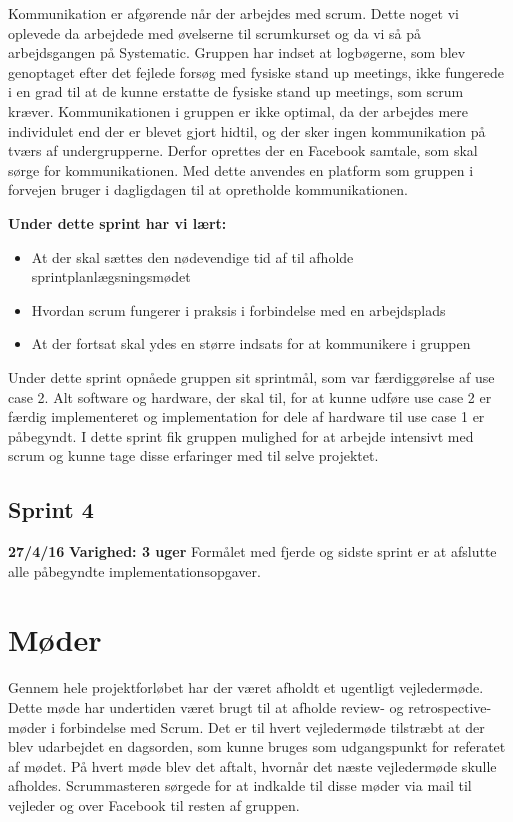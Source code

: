 	Kommunikation er afgørende når der arbejdes med scrum. Dette noget vi oplevede da arbejdede med øvelserne til scrumkurset og da vi så på arbejdsgangen på Systematic. Gruppen har indset at logbøgerne, som blev genoptaget efter det fejlede forsøg med fysiske stand up meetings, ikke fungerede i en grad til at de kunne erstatte de fysiske stand up meetings, som scrum kræver. Kommunikationen i gruppen er ikke optimal, da der arbejdes mere individulet end der er blevet gjort hidtil, og der sker ingen kommunikation på tværs af undergrupperne. Derfor oprettes der en Facebook samtale, som skal sørge for kommunikationen. Med dette anvendes en platform som gruppen i forvejen bruger i dagligdagen til at opretholde kommunikationen.  \newline 
	
	\textbf{Under dette sprint har vi lært:}
	\begin{itemize}
		\item At der skal sættes den nødevendige tid af til afholde sprintplanlægsningsmødet
		\item Hvordan scrum fungerer i praksis i forbindelse med en arbejdsplads
		\item At der fortsat skal ydes en større indsats for at kommunikere i gruppen
	\end{itemize}
	
	Under dette sprint opnåede gruppen sit sprintmål, som var færdiggørelse af use case 2. Alt software og hardware, der skal til, for at kunne udføre use case 2 er færdig implementeret og implementation for dele af hardware til use case 1 er påbegyndt. I dette sprint fik gruppen mulighed for at arbejde intensivt med scrum og kunne tage disse erfaringer med til selve projektet. 

	\subsection{Sprint 4}
	\textbf{27/4/16}\newline
	\textbf{Varighed: 3 uger} \newline
	Formålet med fjerde og sidste sprint er at afslutte alle påbegyndte implementationsopgaver.  
	
\section{Møder}
Gennem hele projektforløbet har der været afholdt et ugentligt vejledermøde. Dette møde har undertiden været brugt til at afholde review- og retrospective-møder i forbindelse med Scrum. Det er til hvert vejledermøde tilstræbt at der blev udarbejdet en dagsorden, som kunne bruges som udgangspunkt for referatet af mødet. På hvert møde blev det aftalt, hvornår det næste vejledermøde skulle afholdes. Scrummasteren sørgede for at indkalde til disse møder via mail til vejleder og over Facebook til resten af gruppen. 

